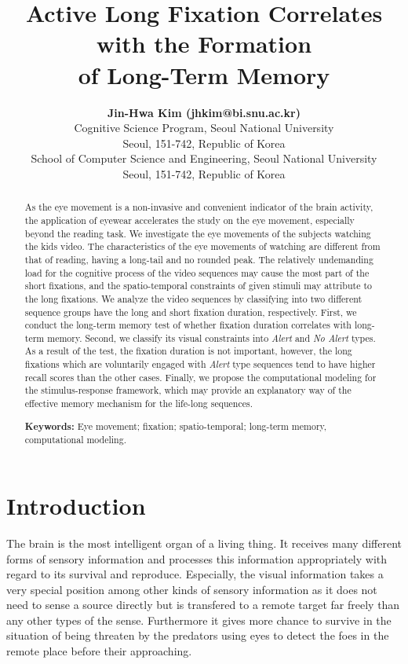 \documentclass[10pt,letterpaper]{article}
\title{Active Long Fixation Correlates with the Formation \\
of Long-Term Memory}
\author{{\large \bf Jin-Hwa Kim (jhkim@bi.snu.ac.kr)} \\
  Cognitive Science Program, Seoul National University \\
  Seoul, 151-742, Republic of Korea
  \AND {\large \bf Byoung-Tak Zhang (btzhang@bi.snu.ac.kr)} \\
  School of Computer Science and Engineering, Seoul National University \\
  Seoul, 151-742, Republic of Korea}
\begin{document}
\maketitle

\begin{abstract}
As the eye movement is a non-invasive and convenient indicator of the brain activity, the application of eyewear accelerates the study on the eye movement, especially beyond the reading task. We investigate the eye movements of the subjects watching the kids video. The characteristics of the eye movements of watching are different from that of reading, having a long-tail and no rounded peak. The relatively undemanding load for the cognitive process of the video sequences may cause the most part of the short fixations, and the spatio-temporal constraints of given stimuli may attribute to the long fixations. We analyze the video sequences by classifying into two different sequence groups have the long and short fixation duration, respectively. First, we conduct the long-term memory test of whether fixation duration correlates with long-term memory. Second, we classify its visual constraints into \textit{Alert} and \textit{No Alert} types. As a result of the test, the fixation duration is not important, however, the long fixations which are voluntarily engaged with \textit{Alert} type sequences tend to have higher recall scores than the other cases. Finally, we propose the computational modeling for the stimulus-response framework, which may provide an explanatory way of the effective memory mechanism for the life-long sequences.

\textbf{Keywords:} 
Eye movement; fixation; spatio-temporal; long-term memory, computational modeling.
\end{abstract}


\section{Introduction}

The brain is the most intelligent organ of a living thing. It receives many different forms of sensory information and processes this information appropriately with regard to its survival and reproduce. Especially, the visual information takes a very special position among other kinds of sensory information as it does not need to sense a source directly but is transfered to a remote target far freely than any other types of the sense. Furthermore it gives more chance to survive in the situation of being threaten by the predators using eyes to detect the foes in the remote place before their approaching. 
\end{document}
